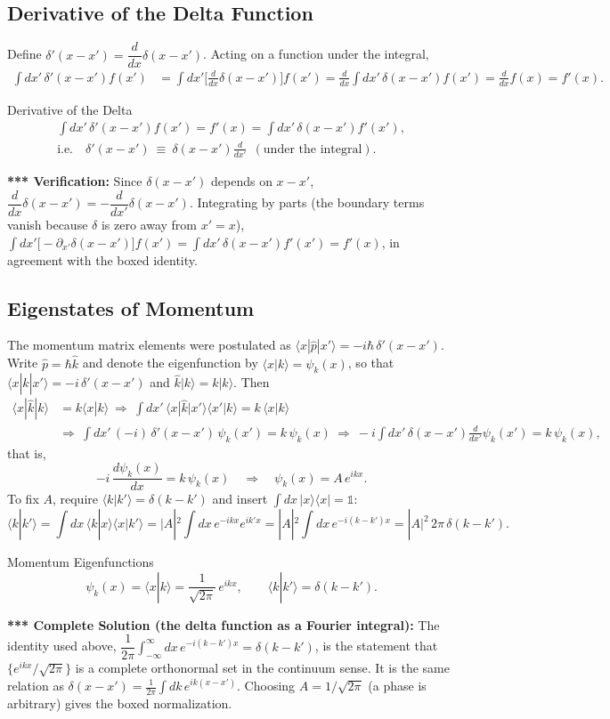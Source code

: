 \documentclass[11pt,a4paper]{article}
\begin{document}
\subsection{Derivative of the Delta Function}
Define $\delta'(x-x')=\dfrac d{dx}\delta(x-x')$. Acting on a function under the integral,
\begin{align*}
\int dx'\,\delta'(x-x')f(x')&=\int dx'\Big[\frac d{dx}\delta(x-x')\Big]f(x')
=\frac d{dx}\int dx'\,\delta(x-x')f(x')=\frac d{dx}f(x)=f'(x).
\end{align*}
\begin{thm}{Derivative of the Delta}
\begin{gather*}
\int dx'\,\delta'(x-x')f(x')=f'(x)=\int dx'\,\delta(x-x')f'(x'),\\
\text{i.e.}\quad \delta'(x-x')\ \equiv\ \delta(x-x')\frac d{dx'}\ \ (\text{under the integral}).
\end{gather*}
\end{thm}
\textbf{*** Verification:} Since $\delta(x-x')$ depends on $x-x'$, $\dfrac d{dx}\delta(x-x')=-\dfrac d{dx'}\delta(x-x')$. Integrating by parts (the boundary terms vanish because $\delta$ is zero away from $x'=x$), $\int dx'\big[-\partial_{x'}\delta(x-x')\big]f(x')=\int dx'\,\delta(x-x')f'(x')=f'(x)$, in agreement with the boxed identity.

\subsection{Eigenstates of Momentum}
The momentum matrix elements were postulated as $\langle x|\hat p|x'\rangle=-i\hbar\,\delta'(x-x')$. Write $\hat p=\hbar\hat k$ and denote the eigenfunction by $\langle x|k\rangle=\psi_k(x)$, so that $\langle x|\hat k|x'\rangle=-i\,\delta'(x-x')$ and $\hat k|k\rangle=k|k\rangle$. Then
\begin{align*}
\langle x|\hat k|k\rangle&=k\langle x|k\rangle\ \Rightarrow\ \int dx'\,\langle x|\hat k|x'\rangle\langle x'|k\rangle=k\,\langle x|k\rangle\\
&\Rightarrow\ \int dx'\,(-i)\,\delta'(x-x')\,\psi_k(x')=k\,\psi_k(x)\ \Rightarrow\ -i\int dx'\,\delta(x-x')\frac d{dx'}\psi_k(x')=k\,\psi_k(x),
\end{align*}
that is,
\[
-i\,\frac{d\psi_k(x)}{dx}=k\,\psi_k(x)\quad\Longrightarrow\quad\psi_k(x)=A\,e^{ikx}.
\]
To fix $A$, require $\langle k|k'\rangle=\delta(k-k')$ and insert $\int dx\,|x\rangle\langle x|=\mathbb 1$:
\[
\langle k|k'\rangle=\int dx\,\langle k|x\rangle\langle x|k'\rangle=|A|^2\int dx\,e^{-ikx}e^{ik'x}=|A|^2\int dx\,e^{-i(k-k')x}=|A|^2\,2\pi\,\delta(k-k').
\]
\begin{thm}{Momentum Eigenfunctions}
\[
\psi_k(x)=\langle x|k\rangle=\frac1{\sqrt{2\pi}}\,e^{ikx},\qquad \langle k|k'\rangle=\delta(k-k').
\]
\end{thm}
\textbf{*** Complete Solution (the delta function as a Fourier integral):} The identity used above, $\dfrac1{2\pi}\displaystyle\int_{-\infty}^\infty dx\,e^{-i(k-k')x}=\delta(k-k')$, is the statement that $\{e^{ikx}/\sqrt{2\pi}\}$ is a complete orthonormal set in the continuum sense. It is the same relation as $\delta(x-x')=\frac1{2\pi}\int dk\,e^{ik(x-x')}$. Choosing $A=1/\sqrt{2\pi}$ (a phase is arbitrary) gives the boxed normalization.
\end{document}
